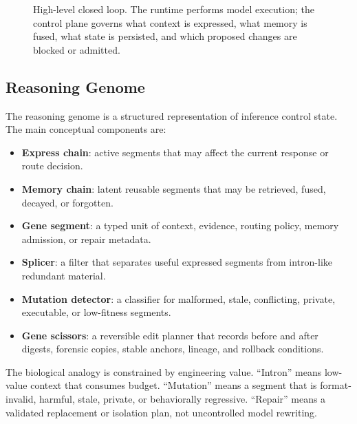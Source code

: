 \documentclass[10pt]{article}
\begin{document}
\begin{figure}[t]
\centering
{}
\caption{High-level closed loop. The runtime performs model execution; the
control plane governs what context is expressed, what memory is fused, what
state is persisted, and which proposed changes are blocked or admitted.}
\label{fig:closed-loop}
\end{figure}

\subsection{Reasoning Genome}

The reasoning genome is a structured representation of inference control state.
The main conceptual components are:

\begin{itemize}[leftmargin=*]
  \item \textbf{Express chain}: active segments that may affect the current
  response or route decision.
  \item \textbf{Memory chain}: latent reusable segments that may be retrieved,
  fused, decayed, or forgotten.
  \item \textbf{Gene segment}: a typed unit of context, evidence, routing
  policy, memory admission, or repair metadata.
  \item \textbf{Splicer}: a filter that separates useful expressed segments
  from intron-like redundant material.
  \item \textbf{Mutation detector}: a classifier for malformed, stale,
  conflicting, private, executable, or low-fitness segments.
  \item \textbf{Gene scissors}: a reversible edit planner that records before
  and after digests, forensic copies, stable anchors, lineage, and rollback
  conditions.
\end{itemize}

The biological analogy is constrained by engineering value. ``Intron'' means
low-value context that consumes budget. ``Mutation'' means a segment that is
format-invalid, harmful, stale, private, or behaviorally regressive. ``Repair''
means a validated replacement or isolation plan, not uncontrolled model
rewriting.
\end{document}

